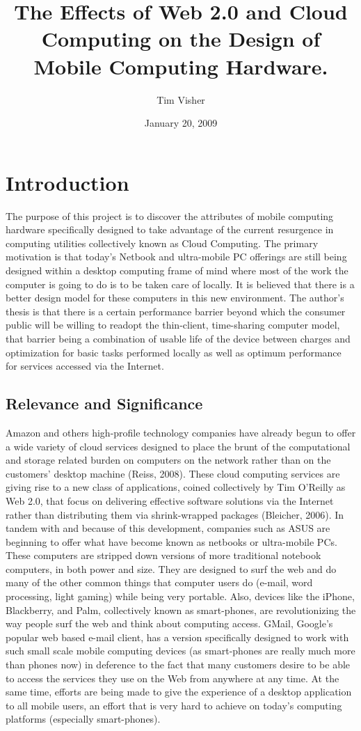 \documentclass[12pt,oneside,letterpaper]{article}
\author{Tim Visher}
\title{The Effects of Web 2.0 and Cloud Computing on the Design of Mobile Computing Hardware.}
\date{January 20, 2009}
\begin{document}

\tableofcontents
\newpage

\section{Introduction}

The purpose of this project is to discover the attributes of mobile computing
hardware specifically designed to take advantage of the current resurgence in
computing utilities collectively known as Cloud Computing.  The primary
motivation is that today's Netbook and ultra-mobile PC offerings are still being
designed within a desktop computing frame of mind where most of the work the
computer is going to do is to be taken care of locally.  It is believed that
there is a better design model for these computers in this new environment.  The
author's thesis is that there is a certain performance barrier beyond which the
consumer public will be willing to readopt the thin-client, time-sharing
computer model, that barrier being a combination of usable life of the device
between charges and optimization for basic tasks performed locally as well as
optimum performance for services accessed via the Internet.

\subsection{Relevance and Significance}

Amazon and others high-profile technology companies have already begun to offer
a wide variety of cloud services designed to place the brunt of the
computational and storage related burden on computers on the network rather than
on the customers' desktop machine (Reiss, 2008).  These cloud computing services
are giving rise to a new class of applications, coined collectively by Tim
O'Reilly as Web 2.0, that focus on delivering effective software solutions via
the Internet rather than distributing them via shrink-wrapped packages
(Bleicher, 2006).  In tandem with and because of this development, companies
such as ASUS are beginning to offer what have become known as netbooks or
ultra-mobile PCs.  These computers are stripped down versions of more
traditional notebook computers, in both power and size.  They are designed to
surf the web and do many of the other common things that computer users do
(e-mail, word processing, light gaming) while being very portable.  Also,
devices like the iPhone, Blackberry, and Palm, collectively known as
smart-phones, are revolutionizing the way people surf the web and think about
computing access.  GMail, Google's popular web based e-mail client, has a
version specifically designed to work with such small scale mobile computing
devices (as smart-phones are really much more than phones now) in deference to
the fact that many customers desire to be able to access the services they use
on the Web from anywhere at any time.  At the same time, efforts are being made
to give the experience of a desktop application to all mobile users, an effort
that is very hard to achieve on today's computing platforms (especially
smart-phones).
\end{document}

